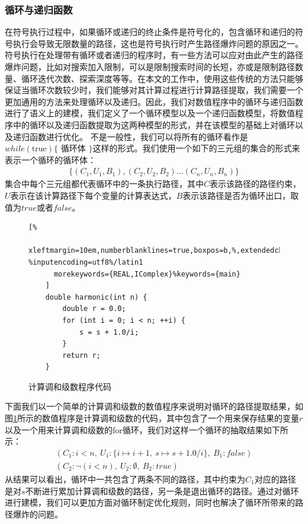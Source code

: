 \subsubsection{循环与递归函数}

在符号执行过程中，如果循环或递归的终止条件是符号化的，包含循环和递归的符号执行会导致无限数量的路径，这也是符号执行时产生路径爆炸问题的原因之一。符号执行在处理带有循环或者递归的程序时，有一些方法可以应对由此产生的路径爆炸问题，比如对搜索加入限制，可以是限制搜索时间的长短，亦或是限制路径数量、循环迭代次数、探索深度等等。在本文的工作中，使用这些传统的方法只能够保证当循环次数较少时，我们能够对其计算过程进行计算路径提取，我们需要一个更加通用的方法来处理循环以及递归。因此，我们对数值程序中的循环与递归函数进行了语义上的建模，我们定义了一个循环模型以及一个递归函数模型，将数值程序中的循环以及递归函数提取为这两种模型的形式，并在该模型的基础上对循环以及递归函数进行优化。
不是一般性，我们可以将所有的循环看作是 $while(\text{true}) \{$ 循环体 $\}$这样的形式。我们使用一个如下的三元组的集合的形式来表示一个循环的循环体：
\begin{align*}
    \{(C_1, U_1, B_1), (C_2, U_2, B_2) ... (C_n, U_n, B_n)\}
\end{align*}
集合中每个三元组都代表循环中的一条执行路径，其中$C$表示该路径的路径约束，$U$表示在该计算路径下每个变量的计算表达式，$B$表示该路径是否为循环出口，取值为$true$或者$false$。


\begin{figure}[htbp]
  \centering
  \begin{lstlisting}[%
      xleftmargin=10em,numberblanklines=true,boxpos=b,%,extendedchars=\true, %inputencoding=utf8%/latin1
      morekeywords={REAL,IComplex}%keywords={main}
    ]
    double harmonic(int n) {
        double r = 0.0;
        for (int i = 0; i < n; ++i) {
            s = s + 1.0/i;
        }
        return r;
    }
  \end{lstlisting}
  \caption{计算调和级数程序代码}\label{lst:harmoniccode}
\end{figure}

下面我们以一个简单的计算调和级数的数值程序来说明对循环的路径提取结果，如图\ref{lst:harmoniccode}所示的数值程序是计算调和级数的代码，其中包含了一个用来保存结果的变量$r$以及一个用来计算调和级数的for循环，我们对这样一个循环的抽取结果如下所示：
\begin{gather*}
  (C_1: i<n,\ U_1:\{i \mapsto i+1,\ s \mapsto s + 1.0/i\},\ B_1: false) \\
  (C_2: \neg(i<n),\ U_2: \emptyset ,\ B_2: true)
\end{gather*}
从结果可以看出，循环中一共包含了两条不同的路径，其中约束为$C_1$对应的路径是对$s$不断进行累加计算调和级数的路径，另一条是退出循环的路径。通过对循环进行建模，我们可以更加方面对循环制定优化规则，同时也解决了循环所带来的路径爆炸的问题。
 
